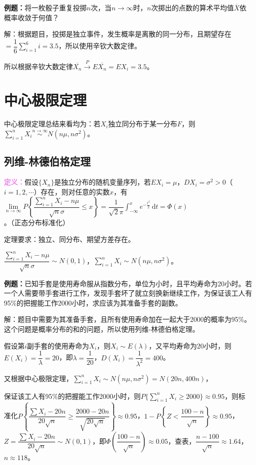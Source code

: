 \documentclass[UTF8, 12pt]{ctexart}
\begin{document}
\textbf{例题：}将一枚骰子重复投掷$n$次，当$n\to\infty$时，$n$次掷出的点数的算术平均值$\overline{X}$依概率收敛于何值？

解：根据题目，投掷是独立事件，发生概率是离散的同一分布，且期望存在$=\dfrac{1}{6}\sum\limits_{i=1}^6i=3.5$，所以使用辛钦大数定律。

所以根据辛钦大数定律$\overline{X_n}\overset{P}{\rightarrow}E\overline{X_n}=EX_i=3.5$。

\section{中心极限定理}

中心极限定理总结来看均为：若$X_i$独立同分布于某一分布$F$，则$\sum\limits_{i=1}^nX_i\overset{n\to\infty}{\sim}N(n\mu,n\sigma^2)$。

\subsection{列维-林德伯格定理}

\textcolor{violet}{\textbf{定义：}}假设$\{X_n\}$是独立分布的随机变量序列，若$EX_i=\mu$，$DX_i=\sigma^2>0$（$i=1,2,\cdots$）存在，则对任意的实数$x$，有$\lim\limits_{n\to\infty}P\left\{\dfrac{\sum\limits_{i=1}^nX_i-n\mu}{\sqrt{n}\sigma}\leqslant x\right\}=\dfrac{1}{\sqrt{2}\pi}\int_{-\infty}^xe^{-\frac{t^2}{2}}\,\textrm{d}t=\varPhi(x)$。（正态分布标准化）

定理要求：独立、同分布、期望方差存在。

$\dfrac{\sum\limits_{i=1}^nX_i-n\mu}{\sqrt{n}\sigma}\sim N(0,1)$，$\sum\limits_{i=1}^nX_i\sim N(n\mu,n\sigma^2)$。

\textbf{例题：}已知手套是使用寿命服从指数分布，单位为小时，且平均寿命为20小时。若一个人需要带手套进行工作，发现手套坏了就立刻换新继续工作，为保证该工人有95\%的把握能工作2000小时，求应该为其准备手套的副数。

解：题目中需要为其准备手套，且所有使用寿命加在一起大于2000的概率为95\%。这个问题是概率分布的和的问题，所以使用列维-林德伯格定理。

假设第$i$副手套的使用寿命为$X_i$，则$X_i\sim E(\lambda)$，又平均寿命为$20$小时，则$E(X_i)=\dfrac{1}{\lambda}=20$，即$\lambda=\dfrac{1}{20}$，$D(X_i)=\dfrac{1}{\lambda^2}=400$。

又根据中心极限定理，$\sum\limits_{i=1}^nX_i\sim N(n\mu,n\sigma^2)=N(20n,400n)$，

保证该工人有95\%的把握能工作2000小时，则$P\{\sum\limits_{i=1}^nX_i\geqslant2000\}\approx0.95$，则标准化$P\left\{\dfrac{\sum X_i-20n}{20\sqrt{n}}\geqslant\dfrac{2000-20n}{\sqrt{20\sqrt{n}}}\right\}\approx0.95$，$1-P\left\{Z<\dfrac{100-n}{\sqrt{n}}\right\}\approx0.95$，$Z=\dfrac{\sum X_i-20n}{20\sqrt{n}}\sim N(0,1)$，即$\varPhi(\dfrac{100-n}{\sqrt{n}})\approx0.05$，查表，$\dfrac{n-100}{\sqrt{n}}\approx1.64$，$n\approx118$。
\end{document}
